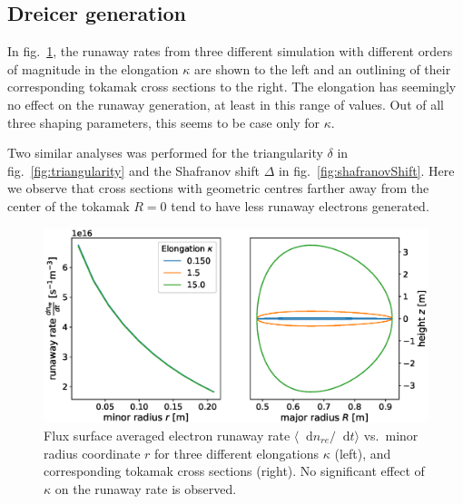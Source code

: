 \documentclass[11pt,a4paper]{article}
\newcommand*\diff{\mathop{}\!\mathrm{d}}
\begin{document}
\subsection{Dreicer generation}
\label{sec:dreicer}
In fig.\ \ref{fig:elongation}, the runaway rates from three different simulation with different orders of magnitude in the elongation $\kappa$ are shown to the left and an outlining of their corresponding tokamak cross sections to the right.
The elongation has seemingly no effect on the runaway generation, at least in this range of values.
Out of all three shaping parameters, this seems to be case only for $\kappa$.

Two similar analyses was performed for the triangularity $\delta$ in fig.\ \ref{fig:triangularity} and the Shafranov shift $\Delta$ in fig.\ \ref{fig:shafranovShift}.
Here we observe that cross sections with geometric centres farther away from the center of the tokamak $R=0$ tend to have less runaway electrons generated.

\begin{figure}[H]
    \centering
    \captionsetup{width=.8\textwidth}
    \includegraphics[width=\textwidth]{figs/elongation.eps}
    \caption{Flux surface averaged electron runaway rate $\langle\diff{n}_{re}/\diff{t}\rangle$ vs.\ minor radius coordinate $r$ for three different elongations $\kappa$ (left), and corresponding tokamak cross sections (right).
    No significant effect of $\kappa$ on the runaway rate is observed.}
    \label{fig:elongation}
\end{figure}
\end{document}
